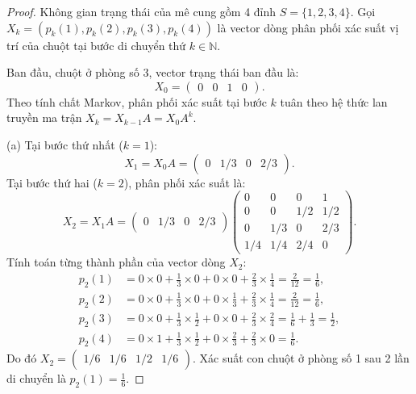 \documentclass{article}
\begin{document}
\begin{proof}
	Không gian trạng thái của mê cung gồm 4 đỉnh $S = \{1, 2, 3, 4\}$. Gọi $X_k = (p_k(1), p_k(2), p_k(3), p_k(4))$ là vector dòng phân phối xác suất vị trí của chuột tại bước di chuyển thứ $k \in \mathbb{N}$.
	
	Ban đầu, chuột ở phòng số 3, vector trạng thái ban đầu là:
	\begin{equation*}
		X_0 = \begin{pmatrix} 0 & 0 & 1 & 0 \end{pmatrix}.
	\end{equation*}
	Theo tính chất Markov, phân phối xác suất tại bước $k$ tuân theo hệ thức lan truyền ma trận $X_k = X_{k-1}A = X_0 A^k$.
	
	(a) Tại bước thứ nhất ($k = 1$):
	\begin{equation*}
		X_1 = X_0 A = \begin{pmatrix} 0 & 1/3 & 0 & 2/3 \end{pmatrix}.
	\end{equation*}
	Tại bước thứ hai ($k = 2$), phân phối xác suất là:
	\begin{equation*}
		X_2 = X_1 A = \begin{pmatrix} 0 & 1/3 & 0 & 2/3 \end{pmatrix} \begin{pmatrix}
			0 & 0 & 0 & 1 \\
			0 & 0 & 1/2 & 1/2 \\
			0 & 1/3 & 0 & 2/3 \\
			1/4 & 1/4 & 2/4 & 0
		\end{pmatrix}.
	\end{equation*}
	Tính toán từng thành phần của vector dòng $X_2$:
	\begin{align*}
		p_2(1) &= 0 \times 0 + \frac{1}{3} \times 0 + 0 \times 0 + \frac{2}{3} \times \frac{1}{4} = \frac{2}{12} = \frac{1}{6}, \\
		p_2(2) &= 0 \times 0 + \frac{1}{3} \times 0 + 0 \times \frac{1}{3} + \frac{2}{3} \times \frac{1}{4} = \frac{2}{12} = \frac{1}{6}, \\
		p_2(3) &= 0 \times 0 + \frac{1}{3} \times \frac{1}{2} + 0 \times 0 + \frac{2}{3} \times \frac{2}{4} = \frac{1}{6} + \frac{1}{3} = \frac{1}{2}, \\
		p_2(4) &= 0 \times 1 + \frac{1}{3} \times \frac{1}{2} + 0 \times \frac{2}{3} + \frac{2}{3} \times 0 = \frac{1}{6}.
	\end{align*}
	Do đó $X_2 = \begin{pmatrix} 1/6 & 1/6 & 1/2 & 1/6 \end{pmatrix}$. Xác suất con chuột ở phòng số 1 sau 2 lần di chuyển là $p_2(1) = \frac{1}{6}$.
	

\end{proof}
\end{document}
